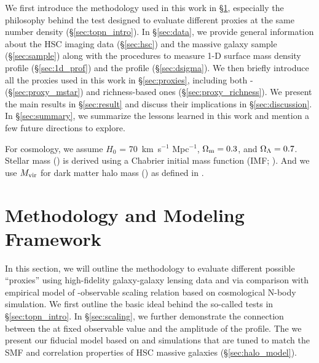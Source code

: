 \documentclass[a4paper,fleqn,usenatbib]{mnras}
\begin{document}
    We first introduce the methodology used in this work in \S \ref{sec:method}, especially the 
    philosophy behind the \topn{} test designed to evaluate different \mvir{} proxies at the 
    same number density (\S \ref{sec:topn_intro}).
    In \S \ref{sec:data}, we provide general information about the HSC imaging data 
    (\S \ref{sec:hsc}) and the massive galaxy sample (\S \ref{sec:sample}) along with the 
    procedures to measure 1-D surface mass density profile (\S \ref{sec:1d_prof}) and the
    \dsigma{} profile (\S \ref{sec:dsigma}). 
    We then briefly introduce all the \mvir{} proxies used in this work in \S \ref{sec:proxies},
    including both \mstar{}- (\S \ref{sec:proxy_mstar}) and richness-based ones 
    (\S \ref{sec:proxy_richness}).
    We present the main results in \S \ref{sec:result} and
    discuss their implications in \S \ref{sec:discussion}.
    In \S \ref{sec:summary}, we summarize the lessons learned in this work and mention a few 
    future directions to explore.


    For cosmology, we assume $H_0$ = 70~km~s$^{-1}$ Mpc$^{-1}$,
    ${\Omega}_{\rm m}=0.3$, and ${\Omega}_{\rm \Lambda}=0.7$.
    Stellar mass (\mstar{}) is derived using a Chabrier initial mass function
    (IMF; \citealt{Chabrier2003}).
    And we use $M_{\rm vir}$ for dark matter halo mass (\mhalo{}) as
    defined in \citealt{BryanNorman1998}.


\section{Methodology and Modeling Framework}
    \label{sec:method}

    In this section, we will outline the methodology to evaluate different possible \mvir{}
    ``proxies'' using high-fidelity galaxy-galaxy lensing data and via comparison with empirical
    model of \mvir{}-observable scaling relation based on cosmological N-body simulation.
    We first outline the basic ideal behind the so-called \topn{} tests in \S \ref{sec:topn_intro}.
    In \S \ref{sec:scaling}, we further demonstrate the connection between the \sigmh{} at 
    fixed observable value and the amplitude of the \dsigma{} profile.
    The we present our fiducial model based on  and \smdpl{} simulations that are 
    tuned to match the SMF and correlation properties of HSC massive galaxies 
    (\S \ref{sec:halo_model}).
\end{document}
